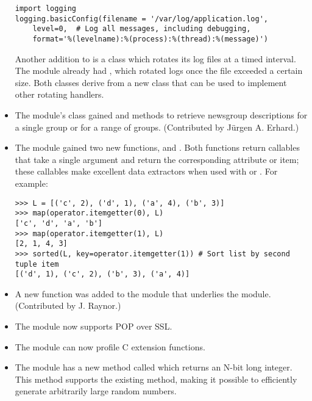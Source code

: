 \documentclass{howto}
\begin{document}
\begin{itemize}
\begin{verbatim}
import logging
logging.basicConfig(filename = '/var/log/application.log',
    level=0,  # Log all messages, including debugging,
    format='%(levelname):%(process):%(thread):%(message)')	            
\end{verbatim}

Another addition to  is a
 class which rotates its log files at
a timed interval.  The module already had ,
which rotated logs once the file exceeded a certain size.  Both
classes derive from a new  class that can
be used to implement other rotating handlers.

\item The  module's  class gained
 and  methods to retrieve 
newsgroup descriptions for a single group or for a range of groups.
(Contributed by J\"urgen A. Erhard.)

\item The  module gained two new functions, 
 and .
Both functions return callables that take a single argument and return
the corresponding attribute or item; these callables make excellent
data extractors when used with  or
.  For example:

\begin{verbatim}
>>> L = [('c', 2), ('d', 1), ('a', 4), ('b', 3)]
>>> map(operator.itemgetter(0), L)
['c', 'd', 'a', 'b']
>>> map(operator.itemgetter(1), L)
[2, 1, 4, 3]
>>> sorted(L, key=operator.itemgetter(1)) # Sort list by second tuple item
[('d', 1), ('c', 2), ('b', 3), ('a', 4)]
\end{verbatim}

\item A new  function was added to the
 module that underlies the  module.
(Contributed by J. Raynor.)

\item The  module now supports POP over SSL.

\item The  module can now profile C extension functions.

\item The  module has a new method called  
   which returns an N-bit long integer.  This method supports the existing
    method, making it possible to efficiently generate
   arbitrarily large random numbers.


\end{itemize}
\end{document}
